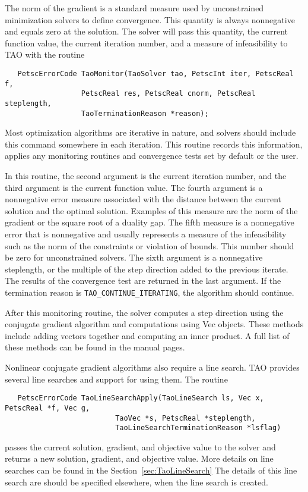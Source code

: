 The norm of the gradient is a standard measure used
by unconstrained minimization solvers to define convergence.
This quantity is always nonnegative and equals zero at the solution.  
The solver will pass this quantity, the current
function value, the current iteration number, and a measure of
infeasibility to TAO with the routine
\begin{verbatim}
   PetscErrorCode TaoMonitor(TaoSolver tao, PetscInt iter, PetscReal f,
                  PetscReal res, PetscReal cnorm, PetscReal steplength,
                  TaoTerminationReason *reason);
\end{verbatim}
Most optimization algorithms are iterative in nature, and solvers should
include this command somewhere in each iteration.  This routine
records this information, applies any monitoring routines and 
convergence tests set by default or the user.

In this routine, the second argument is the current
iteration number, and the third argument is the current function value.
The fourth argument is a nonnegative error measure associated with the
distance between the current solution and the optimal solution.  Examples
of this measure are the norm of the gradient or the square root of a duality 
gap. The fifth measure is a nonnegative error 
that is nonnegative and usually
represents a measure of the infeasibility
such as the norm of the constraints or violation of bounds.
This number should be zero for unconstrained solvers.
The sixth argument is a nonnegative steplength, 
or the multiple of the step direction added to the previous iterate.
The results of the convergence test are returned in the last argument.
If the termination reason is {\tt TAO\_CONTINUE\_ITERATING}, the
algorithm should continue.

After this monitoring routine, the solver computes a step direction
using the conjugate gradient algorithm and computations using Vec objects.  
These methods include
adding vectors together and computing an inner product.  A full list
of these methods can be found in the manual pages.

Nonlinear conjugate gradient algorithms also require a line search.  TAO
provides several line searches and support for using them.
The routine
\begin{verbatim}
   PetscErrorCode TaoLineSearchApply(TaoLineSearch ls, Vec x, PetscReal *f, Vec g, 
                          TaoVec *s, PetscReal *steplength, 
                          TaoLineSearchTerminationReason *lsflag)
\end{verbatim}
passes the current solution, gradient, and objective value to the
solver and returns a new solution, gradient, and objective value.  More
details on line searches can be found in the Section~\ref{sec:TaoLineSearch}
The details of this line search are should be specified elsewhere, when
the line search is created.

